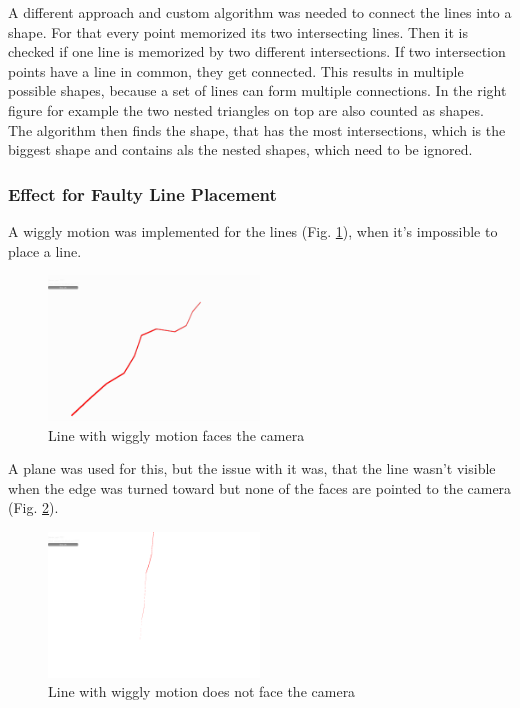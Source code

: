 A different approach and custom algorithm was needed to connect the lines into a shape. For that every point memorized its two intersecting lines. Then it is checked if one line is memorized by two different intersections. If two intersection points have a line in common, they get connected. This results in multiple possible shapes, because a set of lines can form multiple connections. In the right figure for example the two nested triangles on top are also counted as shapes. The algorithm then finds the shape, that has the most intersections, which is the biggest shape and contains als the nested shapes, which need to be ignored.


\subsubsection{Effect for Faulty Line Placement}
A wiggly motion was implemented for the lines (Fig. \ref{fig:Wiggle1}), when it’s impossible to place a line.

\begin{figure}[htbp]
	\centering
		\includegraphics[width=0.50\textwidth]{img/Wiggle1.png}
	\caption[Line with wiggly motion faces the camera]{Line with wiggly motion faces the camera}
	\label{fig:Wiggle1}
\end{figure}

A plane was used for this, but the issue with it was, that the line wasn’t visible when the edge was turned toward but none of the faces are pointed to the camera (Fig. \ref{fig:Wiggle2}).

\begin{figure}[htbp]
	\centering
		\includegraphics[width=0.50\textwidth]{img/Wiggle2.png}
	\caption[Line with wiggly motion does not face the camera]{Line with wiggly motion does not face the camera}
	\label{fig:Wiggle2}
\end{figure}

